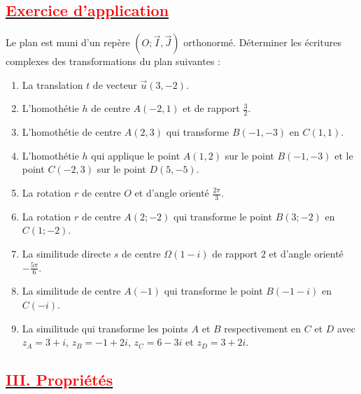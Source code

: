 \documentclass[12pt]{article}
\begin{document}
\subsection*{\underline{\textbf{\textcolor{red}{Exercice d’application}}}}
Le plan est muni d’un repère $(O; \vec{I}, \vec{J})$ orthonormé. Déterminer les écritures complexes des transformations du plan suivantes :
\begin{enumerate}
    \item La translation $t$ de vecteur $\overrightarrow{u}(3, -2)$.
    \item L’homothétie $h$ de centre $A(-2, 1)$ et de rapport $\frac{3}{2}$.
    \item L’homothétie de centre $A(2, 3)$ qui transforme $B(-1, -3)$ en $C(1, 1)$.
    \item L’homothétie $h$ qui applique le point $A(1, 2)$ sur le point $B(-1, -3)$ et le point $C(-2, 3)$ sur le point $D(5, -5)$.
    \item La rotation $r$ de centre $O$ et d’angle orienté $\frac{2\pi}{3}$.
    \item La rotation $r$ de centre $A(2; -2)$ qui transforme le point $B(3; -2)$ en $C(1; -2)$.
    \item La similitude directe $s$ de centre $\Omega(1 - i)$ de rapport $2$ et d’angle orienté $-\frac{5\pi}{6}$.
    \item La similitude de centre $A(-1)$ qui transforme le point $B(-1 - i)$ en $C(-i)$.
    \item La similitude qui transforme les points $A$ et $B$ respectivement en $C$ et $D$ avec $z_A = 3 + i$, $z_B = -1 + 2i$, $z_C = 6 - 3i$ et $z_D = 3 + 2i$.
\end{enumerate}
\subsection*{\underline{\textbf{\textcolor{red}{III. Propriétés}}}}
\end{document}
